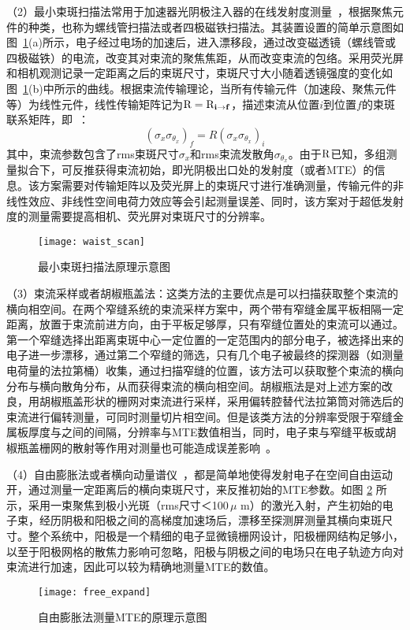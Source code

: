（2）最小束斑扫描法常用于加速器光阴极注入器的在线发射度测量~\cite{engelen2014effective,bazarov2008thermal,bazarov2011thermal,anderson2002space,hauri2010intrinsic}，根据聚焦元件的种类，也称为螺线管扫描法或者四极磁铁扫描法。其装置设置的简单示意图如图~\ref{fig:waist_scan}(a)所示，电子经过电场的加速后，进入漂移段，通过改变磁透镜（螺线管或四极磁铁）的电流，改变其对束流的聚焦焦距，从而改变束流的包络。采用荧光屏和相机观测记录一定距离之后的束斑尺寸，束斑尺寸大小随着透镜强度的变化如图~\ref{fig:waist_scan}(b)中所示的曲线。根据束流传输理论，当所有传输元件（加速段、聚焦元件等）为线性元件，线性传输矩阵记为$\bf{\text{R}}=\bf{\text{R}}_{i\to f}$，描述束流从位置$i$到位置$f$的束斑联系矩阵，即~\cite{bazarov2008thermal}：
\begin{equation}
\label{eq:waist_scan}
\left(\sigma_x \sigma_{\theta_x}\right)_f = R\left(\sigma_x \sigma_{\theta_x}\right)_i
\end{equation}
其中，束流参数包含了rms束斑尺寸$\sigma_x$和rms束流发散角$\sigma_{\theta_x}$。由于$\bf{\text{R}}$已知，多组测量拟合下，可反推获得束流初始，即光阴极出口处的发射度（或者MTE）的信息。该方案需要对传输矩阵以及荧光屏上的束斑尺寸进行准确测量，传输元件的非线性效应、非线性空间电荷力效应等会引起测量误差、同时，该方案对于超低发射度的测量需要提高相机、荧光屏对束斑尺寸的分辨率。
\begin{figure}[htbp]
\centering
\texttt{[image: waist\_scan]}
\caption{\label{fig:waist_scan} 最小束斑扫描法原理示意图}
\end{figure}

（3）束流采样或者胡椒瓶盖法\cite{anderson2002space,gulliford2013demonstration,li2012nanometer}：这类方法的主要优点是可以扫描获取整个束流的横向相空间。在两个窄缝系统的束流采样方案中，两个带有窄缝金属平板相隔一定距离，放置于束流前进方向，由于平板足够厚，只有窄缝位置处的束流可以通过。第一个窄缝选择出距离束斑中心一定位置的一定范围内的部分电子，被选择出来的电子进一步漂移，通过第二个窄缝的筛选，只有几个电子被最终的探测器（如测量电荷量的法拉第桶）收集，通过扫描窄缝的位置，该方法可以获取整个束流的横向分布与横向散角分布，从而获得束流的横向相空间。胡椒瓶法是对上述方案的改良，用胡椒瓶盖形状的栅网对束流进行采样，采用偏转腔替代法拉第筒对筛选后的束流进行偏转测量，可同时测量切片相空间。但是该类方法的分辨率受限于窄缝金属板厚度与之间的间隔，分辨率与MTE数值相当，同时，电子束与窄缝平板或胡椒瓶盖栅网的散射等作用对测量也可能造成误差影响~\cite{Reiser:2008aa,Maxson:2015aa}。

（4）自由膨胀法或者横向动量谱仪~\cite{feng2015novel,jones2013commissioning}，都是简单地使得发射电子在空间自由运动开，通过测量一定距离后的横向束斑尺寸，来反推初始的MTE参数。如图 \ref{fig:free_expand} 所示，采用一束聚焦到极小光斑（rms尺寸＜100\,$\mu$ m）的激光入射，产生初始的电子束，经历阴极和阳极之间的高梯度加速场后，漂移至探测屏测量其横向束斑尺寸。整个系统中，阳极是一个精细的电子显微镜栅网设计，阳极栅网结构足够小，以至于阳极网格的散焦力影响可忽略，阳极与阴极之间的电场只在电子轨迹方向对束流进行加速，因此可以较为精确地测量MTE的数值\cite{jones2013commissioning}。
\begin{figure}[htbp]
\centering
\texttt{[image: free\_expand]}
\caption{\label{fig:free_expand} 自由膨胀法测量MTE的原理示意图}
\end{figure}

